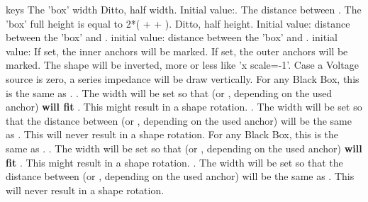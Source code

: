 \documentclass[10pt]{article}
\begin{document}
\begin{describelist*}[30mm]{keys}
    {The 'box' width}
    {Ditto, half width. Initial value:.}
    {The distance between . The 'box' full height is equal to 2*( +  + ).}
   {Ditto, half height. Initial value: }
   {distance between the 'box' and . initial value: }
   {distance between the 'box' and . initial value: }
    {If set, the inner anchors will be marked.}
    {If set, the outer anchors will be marked.}
   {The shape will be inverted, more or less like 'x scale=-1'.}
   {Case a Voltage source is zero, a series impedance will be draw vertically.}
   {For any Black Box, this is the same as .}
   {. The width will be set so that  (or , depending on the used anchor) \textbf{will fit} . This might result in a shape rotation.}
   {. The width will be set so that the distance between  (or , depending on the used anchor) will be the same as . This will never result in a shape rotation.} 
   {For any Black Box, this is the same as .}
   {. The width will be set so that  (or , depending on the used anchor) \textbf{will fit} . This might result in a shape rotation.} 
   {. The width will be set so that the distance between  (or , depending on the used anchor) will be the same as . This will never result in a shape rotation.}

\end{describelist*}
\end{document}
